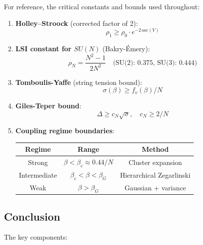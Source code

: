 For reference, the critical constants and bounds used throughout:

\begin{enumerate}
\item \textbf{Holley--Stroock} (corrected factor of 2):
\[
\rho_1 \geq \rho_0 \cdot e^{-2\,\mathrm{osc}(V)}
\]

\item \textbf{LSI constant for $SU(N)$} (Bakry-\'Emery):
\[
\rho_N = \frac{N^2-1}{2N^2} \quad \text{(SU(2): 0.375, SU(3): 0.444)}
\]

\item \textbf{Tomboulis-Yaffe} (string tension bound):
\[
\sigma(\beta) \geq f_v(\beta)/N
\]

\item \textbf{Giles-Teper bound}:
\[
\Delta \geq c_N \sqrt{\sigma}, \quad c_N \geq 2/N 
\]

\item \textbf{Coupling regime boundaries}:
\begin{center}
\begin{tabular}{|c|c|c|}
\hline
\textbf{Regime} & \textbf{Range} & \textbf{Method} \\
\hline
Strong & $\beta < \beta_c \approx 0.44/N$ & Cluster expansion \\
Intermediate & $\beta_c < \beta < \beta_G$ & Hierarchical Zegarlinski \\
Weak & $\beta > \beta_G$ & Gaussian + variance \\
\hline
\end{tabular}
\end{center}
\end{enumerate}

\subsection{Conclusion}

The key components:


